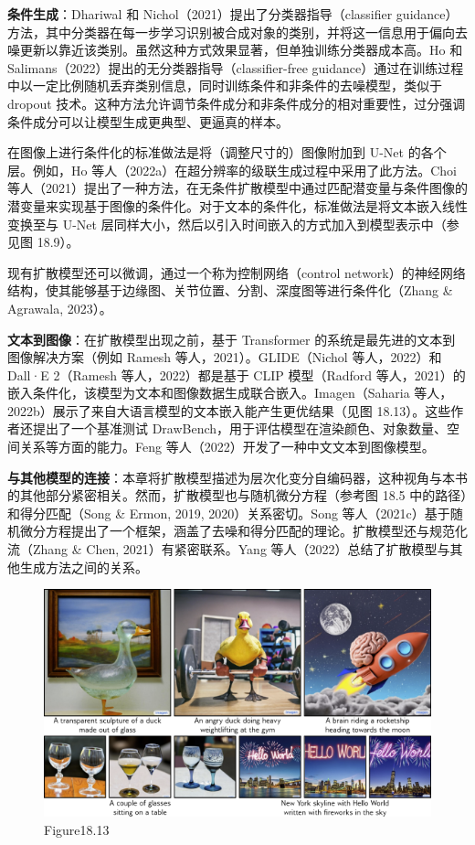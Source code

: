 \textbf{条件生成}：Dhariwal 和 Nichol（2021）提出了分类器指导（classifier guidance）方法，其中分类器在每一步学习识别被合成对象的类别，并将这一信息用于偏向去噪更新以靠近该类别。虽然这种方式效果显著，但单独训练分类器成本高。Ho 和 Salimans（2022）提出的无分类器指导（classifier-free guidance）通过在训练过程中以一定比例随机丢弃类别信息，同时训练条件和非条件的去噪模型，类似于 dropout 技术。这种方法允许调节条件成分和非条件成分的相对重要性，过分强调条件成分可以让模型生成更典型、更逼真的样本。

在图像上进行条件化的标准做法是将（调整尺寸的）图像附加到 U-Net 的各个层。例如，Ho 等人（2022a）在超分辨率的级联生成过程中采用了此方法。Choi 等人（2021）提出了一种方法，在无条件扩散模型中通过匹配潜变量与条件图像的潜变量来实现基于图像的条件化。对于文本的条件化，标准做法是将文本嵌入线性变换至与 U-Net 层同样大小，然后以引入时间嵌入的方式加入到模型表示中（参见图 18.9）。

现有扩散模型还可以微调，通过一个称为控制网络（control network）的神经网络结构，使其能够基于边缘图、关节位置、分割、深度图等进行条件化（Zhang \& Agrawala, 2023）。

\textbf{文本到图像}：在扩散模型出现之前，基于 Transformer 的系统是最先进的文本到图像解决方案（例如 Ramesh 等人，2021）。GLIDE（Nichol 等人，2022）和 Dall·E 2（Ramesh 等人，2022）都是基于 CLIP 模型（Radford 等人，2021）的嵌入条件化，该模型为文本和图像数据生成联合嵌入。Imagen（Saharia 等人，2022b）展示了来自大语言模型的文本嵌入能产生更优结果（见图 18.13）。这些作者还提出了一个基准测试 DrawBench，用于评估模型在渲染颜色、对象数量、空间关系等方面的能力。Feng 等人（2022）开发了一种中文文本到图像模型。

\textbf{与其他模型的连接}：本章将扩散模型描述为层次化变分自编码器，这种视角与本书的其他部分紧密相关。然而，扩散模型也与随机微分方程（参考图 18.5 中的路径）和得分匹配（Song \& Ermon, 2019, 2020）关系密切。Song 等人（2021c）基于随机微分方程提出了一个框架，涵盖了去噪和得分匹配的理论。扩散模型还与规范化流（Zhang \& Chen, 2021）有紧密联系。Yang 等人（2022）总结了扩散模型与其他生成方法之间的关系。


\begin{figure}[ht!]
\centering
\includegraphics[width=0.7\linewidth]{png/chapter18/DiffusionImagen.png}
\caption{Figure18.13}
\end{figure}

